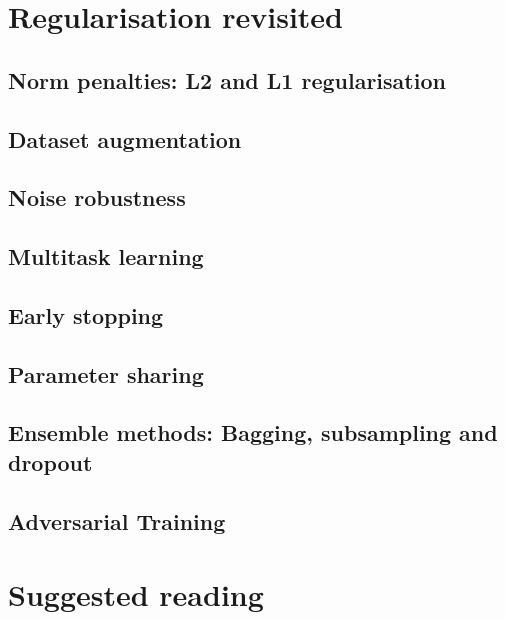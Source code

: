 \section{Regularisation revisited}
\subsection{Norm penalties: L2 and L1 regularisation}
\subsection{Dataset augmentation}
\subsection{Noise robustness}
\subsection{Multitask learning}
\subsection{Early stopping}
\subsection{Parameter sharing}
\subsection{Ensemble methods: Bagging, subsampling and dropout}
\subsection{Adversarial Training}

\section{Suggested reading}

